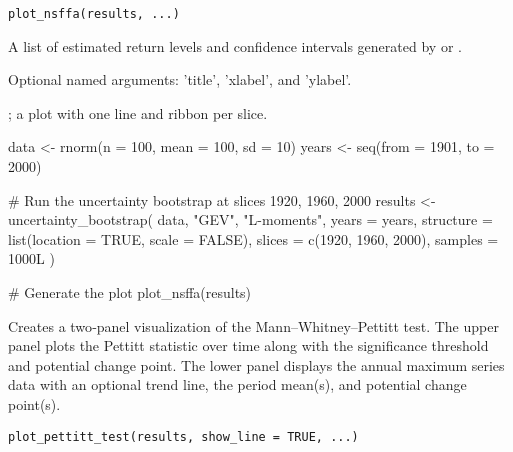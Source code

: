 \documentclass[a4paper]{book}
\begin{document}
%
\begin{Usage}
\begin{verbatim}
plot_nsffa(results, ...)
\end{verbatim}
\end{Usage}
%
\begin{Arguments}
\begin{ldescription}
\item[\code{results}] A list of estimated return levels and confidence intervals
generated by  or .

\item[\code{...}] Optional named arguments: 'title', 'xlabel', and 'ylabel'.
\end{ldescription}
\end{Arguments}
%
\begin{Value}
; a plot with one line and ribbon per slice.
\end{Value}
%
\begin{Examples}
\begin{ExampleCode}

data <- rnorm(n = 100, mean = 100, sd = 10)
years <- seq(from = 1901, to = 2000)

# Run the uncertainty bootstrap at slices 1920, 1960, 2000
results <- uncertainty_bootstrap(
	   data,
   "GEV",
   "L-moments",
   years = years,
   structure = list(location = TRUE, scale = FALSE),
   slices = c(1920, 1960, 2000),
	   samples = 1000L
)

# Generate the plot
plot_nsffa(results)

\end{ExampleCode}
\end{Examples}
%
\begin{Description}
Creates a two‐panel visualization of the Mann–Whitney–Pettitt test. The
upper panel plots the Pettitt  statistic over time along with the
significance threshold and potential change point. The lower panel displays
the annual maximum series data with an optional trend line, the period
mean(s), and potential change point(s).
\end{Description}
%
\begin{Usage}
\begin{verbatim}
plot_pettitt_test(results, show_line = TRUE, ...)
\end{verbatim}
\end{Usage}
\end{document}
